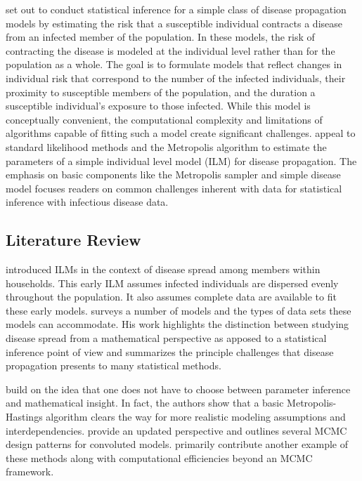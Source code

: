 \documentclass{uwstat572}
\begin{document}
\citet{Brown} set out to conduct statistical inference for a simple class of disease propagation models by estimating the risk that a susceptible individual contracts a disease from an infected member of the population. 
In these models, the risk of contracting the disease is modeled at the individual level rather than for the population as a whole. 
The goal is to formulate models that reflect changes in individual risk that correspond to the number of the infected individuals, their proximity to susceptible members of the population, and the duration a susceptible individual's exposure to those infected. 
While this model is conceptually convenient, the computational complexity and limitations of algorithms capable of fitting such a model create significant challenges.
\citet{Brown} appeal to standard likelihood methods and the Metropolis algorithm \citep{Metropolis} to estimate the parameters of a simple individual level model (ILM) for disease propagation.
The emphasis on basic components like the Metropolis sampler and simple disease model focuses readers on common challenges inherent with data for statistical inference with infectious disease data. 

\subsection{Literature Review}
\label{literature_review}
\citet{Haber} introduced ILMs in the context of disease spread among members within households. 
This early ILM assumes infected individuals are dispersed evenly throughout the population. 
It also assumes complete data are available to fit these early models. 
\citet{Becker} surveys a number of models and the types of data sets these models can accommodate. 
His work highlights the distinction between studying disease spread from a mathematical perspective as apposed to a statistical inference point of view and summarizes the principle challenges that disease propagation presents to many statistical methods.

\citet{ONeill} build on the idea that one does not have to choose between parameter inference and mathematical insight. 
In fact, the authors show that a basic Metropolis-Hastings algorithm clears the way for more realistic modeling assumptions and interdependencies. 
\citet{Jewell} provide an updated perspective and outlines several MCMC design patterns for convoluted models.
\citet{Brown} primarily contribute another example of these methods along with computational efficiencies beyond an MCMC framework. 
\end{document}
